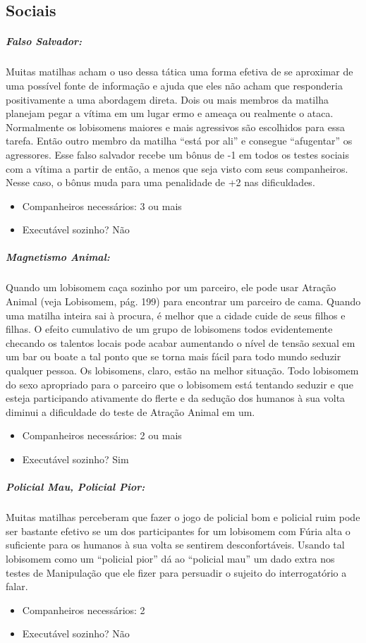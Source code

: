 \begin{multicols}{2}
\subsection{Sociais}

\subparagraph{\textbf{Falso Salvador:}}
Muitas matilhas acham o uso dessa tática uma forma efetiva de se aproximar de uma possível fonte de informação e ajuda que eles não acham que responderia positivamente a uma abordagem direta. Dois ou mais membros da matilha planejam pegar a vítima em um lugar ermo e ameaça ou realmente o ataca. Normalmente os lobisomens maiores e mais agressivos são escolhidos para essa tarefa. Então outro membro da matilha “está por ali” e consegue “afugentar” os agressores. Esse falso salvador recebe um bônus de -1 em todos os testes sociais com a vítima a partir de então, a menos que seja visto com seus companheiros. Nesse caso, o bônus muda para uma penalidade de +2 nas dificuldades.
\begin{itemize}[noitemsep]
\item Companheiros necessários: 3 ou mais
\item Executável sozinho? Não
\end{itemize}

\subparagraph{\textbf{Magnetismo Animal:}}
Quando um lobisomem caça sozinho por um parceiro, ele pode usar Atração Animal (veja Lobisomem, pág. 199) para encontrar um parceiro de cama. Quando uma matilha inteira sai à procura, é melhor que a cidade cuide de seus filhos e filhas. O efeito cumulativo de um grupo de lobisomens todos evidentemente checando os talentos locais pode acabar aumentando o nível de tensão sexual em um bar ou boate a tal ponto que se torna mais fácil para todo mundo seduzir qualquer pessoa. Os lobisomens, claro, estão na melhor situação. Todo lobisomem do sexo apropriado para o parceiro que o lobisomem está tentando seduzir e que esteja participando ativamente do flerte e da sedução dos humanos à sua volta diminui a dificuldade do teste de Atração Animal em um. 
\begin{itemize}[noitemsep]
\item Companheiros necessários: 2 ou mais
\item Executável sozinho? Sim
\end{itemize}

\subparagraph{\textbf{Policial Mau, Policial Pior:}}
Muitas matilhas perceberam que fazer o jogo de policial bom e policial ruim pode ser bastante efetivo se um dos participantes for um lobisomem com Fúria alta o suficiente para os humanos à sua volta se sentirem desconfortáveis. Usando tal lobisomem como um “policial pior” dá ao “policial mau” um dado extra nos testes de Manipulação que ele fizer para persuadir o sujeito do interrogatório a falar. 
\begin{itemize}[noitemsep]
\item Companheiros necessários: 2
\item Executável sozinho? Não
\end{itemize}

\end{multicols}